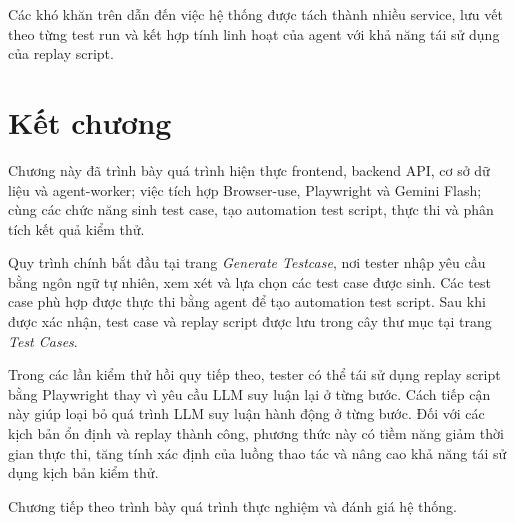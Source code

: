 Các khó khăn trên dẫn đến việc hệ thống được tách thành nhiều service, lưu vết theo từng test run và kết hợp tính linh hoạt của agent với khả năng tái sử dụng của replay script.

\section{Kết chương}

Chương này đã trình bày quá trình hiện thực frontend, backend API, cơ sở dữ liệu và agent-worker; việc tích hợp Browser-use, Playwright và Gemini Flash; cùng các chức năng sinh test case, tạo automation test script, thực thi và phân tích kết quả kiểm thử.

Quy trình chính bắt đầu tại trang \textit{Generate Testcase}, nơi tester nhập yêu cầu bằng ngôn ngữ tự nhiên, xem xét và lựa chọn các test case được sinh. Các test case phù hợp được thực thi bằng agent để tạo automation test script. Sau khi được xác nhận, test case và replay script được lưu trong cây thư mục tại trang \textit{Test Cases}.

Trong các lần kiểm thử hồi quy tiếp theo, tester có thể tái sử dụng replay script bằng Playwright thay vì yêu cầu LLM suy luận lại ở từng bước. Cách tiếp cận này giúp loại bỏ quá trình LLM suy luận hành động ở từng bước. Đối với các kịch bản ổn định và replay thành công, phương thức này có tiềm năng giảm thời gian thực thi, tăng tính xác định của luồng thao tác và nâng cao khả năng tái sử dụng kịch bản kiểm thử.

Chương tiếp theo trình bày quá trình thực nghiệm và đánh giá hệ thống.
